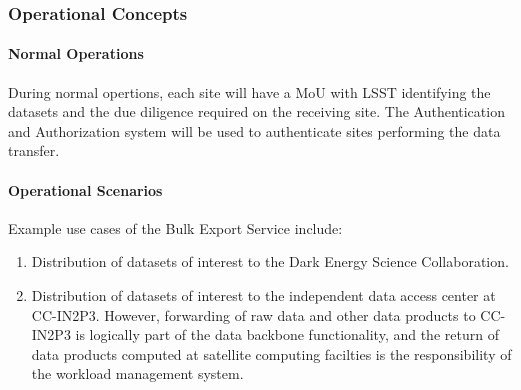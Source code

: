 \subsubsection{Operational Concepts}

\paragraph{Normal Operations}

During normal opertions, each site will have a MoU with LSST identifying the datasets and the due diligence required on the receiving site. The Authentication and Authorization system will be used to authenticate sites performing the data transfer.

\paragraph{Operational Scenarios}

Example use cases of the Bulk Export Service include:

\begin{enumerate}

\item Distribution of datasets of interest to the Dark Energy Science Collaboration.

\item Distribution of datasets of interest to the independent data access center at CC-IN2P3. However, forwarding of raw data and other data products to CC-IN2P3 is logically part of the data backbone functionality, and the return of data products computed at satellite computing facilties is the responsibility of the workload management system.

\end{enumerate}
